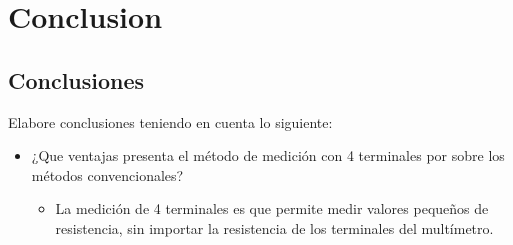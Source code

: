 \chapter{Conclusion}
\section{Conclusiones}
Elabore conclusiones teniendo en cuenta lo siguiente:
\begin{itemize}
  \item ¿Que ventajas presenta el método de medición con 4 terminales por sobre los métodos convencionales?
    \begin{itemize}
      \item La medición de 4 terminales es que permite medir valores pequeños de resistencia, sin importar la resistencia de los terminales del multímetro.


\end{itemize}
\end{itemize}
